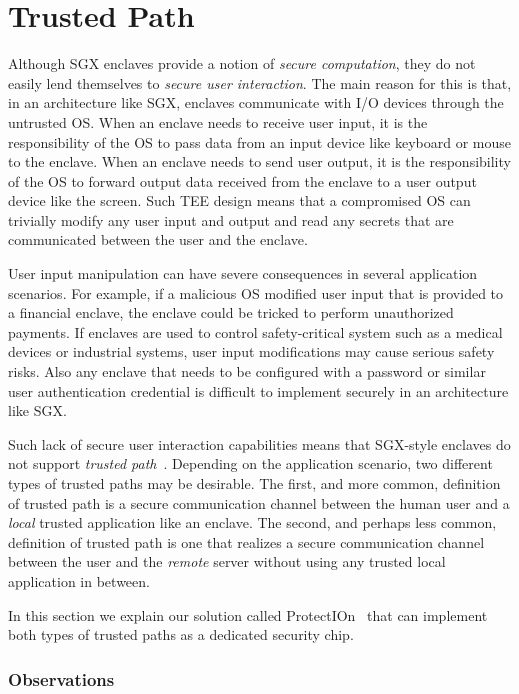 
\section*{Trusted Path}

Although SGX enclaves provide a notion of \emph{secure computation}, they do not easily lend themselves to \emph{secure user interaction}. The main reason for this is that, in an architecture like SGX, enclaves communicate with I/O devices through the untrusted OS. When an enclave needs to receive user input, it is the responsibility of the OS to pass data from an input device like keyboard or mouse to the enclave. When an enclave needs to send user output, it is the responsibility of the OS to forward output data received from the enclave to a user output device like the screen. Such TEE design means that a compromised OS can trivially modify any user input and output and read any secrets that are communicated between the user and the enclave. 

User input manipulation can have severe consequences in several application scenarios. For example, if a malicious OS modified user input that is provided to a financial enclave, the enclave could be tricked to perform unauthorized payments. If enclaves are used to control safety-critical system such as a medical devices or industrial systems, user input modifications may cause serious safety risks. Also any enclave that needs to be configured with a password or similar user authentication credential is difficult to implement securely in an architecture like SGX.

Such lack of secure user interaction capabilities means that SGX-style enclaves do not support \emph{trusted path}~\cite{x}. Depending on the application scenario, two different types of trusted paths may be desirable. The first, and more common, definition of trusted path is a secure communication channel between the human user and a \emph{local} trusted application like an enclave. The second, and perhaps less common, definition of trusted path is one that realizes a secure communication channel between the user and the \emph{remote} server without using any trusted local application in between. 

In this section we explain our solution called \textsf{ProtectIOn}~\cite{protection} that can implement both types of trusted paths as a dedicated security chip. 


\subsubsection*{Observations}

